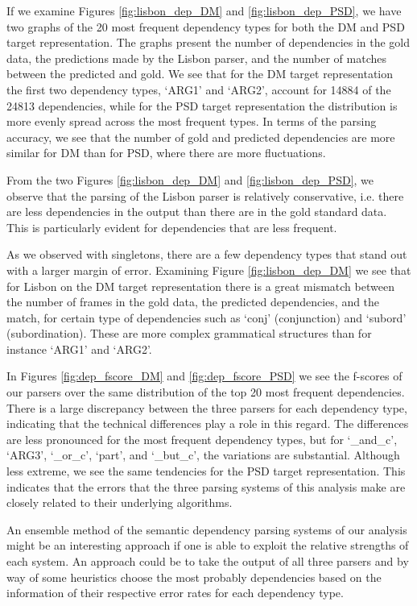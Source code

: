 If we examine Figures \ref{fig:lisbon_dep_DM} and \ref{fig:lisbon_dep_PSD}, we have two graphs of the 20 most frequent dependency types for both the DM and PSD target representation. The graphs present the number of dependencies in the gold data, the predictions made by the Lisbon parser, and the number of matches between the predicted and gold. We see that for the DM target representation the first two dependency types, `ARG1' and `ARG2', account for 14884 of the 24813 dependencies, while for the PSD target representation the distribution is more evenly spread across the most frequent types. In terms of the parsing accuracy, we see that the number of gold and predicted dependencies are more similar for DM than for PSD, where there are more fluctuations.

From the two Figures \ref{fig:lisbon_dep_DM} and \ref{fig:lisbon_dep_PSD}, we observe that the parsing of the Lisbon parser is relatively conservative, i.e. there are less dependencies in the output than there are in the gold standard data. This is particularly evident for dependencies that are less frequent.

As we observed with singletons, there are a few dependency types that stand out with a larger margin of error. Examining Figure \ref{fig:lisbon_dep_DM} we see that for Lisbon on the DM target representation there is a great mismatch between the number of frames in the gold data, the predicted dependencies, and the match, for certain type of dependencies such as `conj' (conjunction) and `subord' (subordination). These are more complex grammatical structures than for instance `ARG1' and `ARG2'.

In Figures \ref{fig:dep_fscore_DM} and \ref{fig:dep_fscore_PSD} we see the f-scores of our parsers over the same distribution of the top 20 most frequent dependencies. There is a large discrepancy between the three parsers for each dependency type, indicating that the technical differences play a role in this regard. The differences are less pronounced for the most frequent dependency types, but for `\_and\_c', `ARG3', `\_or\_c', `part', and `\_but\_c', the variations are substantial. Although less extreme, we see the same tendencies for the PSD target representation. This indicates that the errors that the three parsing systems of this analysis make are closely related to their underlying algorithms. 

An ensemble method of the semantic dependency parsing systems of our analysis might be an interesting approach if one is able to exploit the relative strengths of each system. An approach could be to take the output of all three parsers and by way of some heuristics choose the most probably dependencies based on the information of their respective error rates for each dependency type. 

